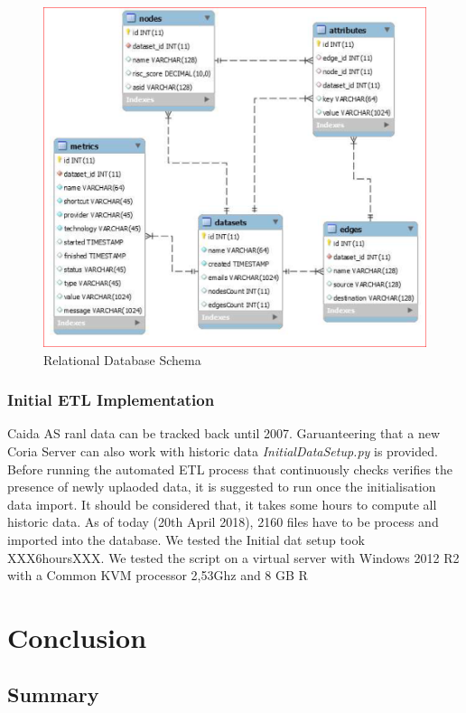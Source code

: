 \documentclass[conference, 11pt]{IEEEtran}
\begin{document}
\begin{figure}[htbp]
\centerline{\includegraphics[scale=0.33]{Graphics/SQL_schema.PNG}}
\caption{Relational Database Schema}
\label{fig:SQL_schema}
\end{figure}

\subsubsection{Initial ETL Implementation}
Caida AS ranl data can be tracked back until 2007. Garuanteering that a new Coria Server can also work with historic data \textit{InitialDataSetup.py} is provided. Before running the automated ETL process that continuously checks verifies the presence of newly uplaoded data, it is suggested to run once the initialisation data import. It should be considered that, it takes some hours to compute all historic data. As of today (20th April 2018), 2160 files have to be process and imported into the database. We tested the Initial dat setup took XXX6hoursXXX. We tested the script on a virtual server with Windows 2012 R2 with a Common KVM processor 2,53Ghz and 8 GB R  




\section{Conclusion}
\subsection{Summary}
\end{document}
